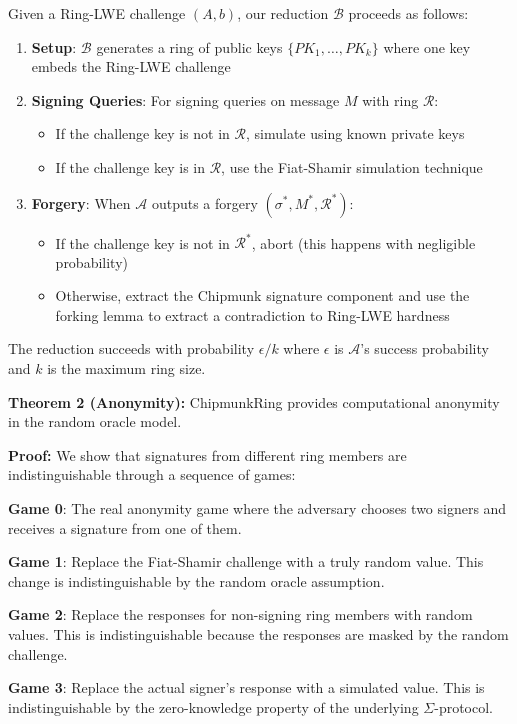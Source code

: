 \documentclass[11pt,a4paper]{article}
\begin{document}
Given a Ring-LWE challenge $(A, b)$, our reduction $\mathcal{B}$ proceeds as follows:
\begin{enumerate}
\item \textbf{Setup}: $\mathcal{B}$ generates a ring of public keys $\{PK_1, \ldots, PK_k\}$ where one key embeds the Ring-LWE challenge
\item \textbf{Signing Queries}: For signing queries on message $M$ with ring $\mathcal{R}$:
   \begin{itemize}
   \item If the challenge key is not in $\mathcal{R}$, simulate using known private keys
   \item If the challenge key is in $\mathcal{R}$, use the Fiat-Shamir simulation technique
   \end{itemize}
\item \textbf{Forgery}: When $\mathcal{A}$ outputs a forgery $(\sigma^*, M^*, \mathcal{R}^*)$:
   \begin{itemize}
   \item If the challenge key is not in $\mathcal{R}^*$, abort (this happens with negligible probability)
   \item Otherwise, extract the Chipmunk signature component and use the forking lemma to extract a contradiction to Ring-LWE hardness
   \end{itemize}
\end{enumerate}

The reduction succeeds with probability $\epsilon/k$ where $\epsilon$ is $\mathcal{A}$'s success probability and $k$ is the maximum ring size.

\textbf{Theorem 2 (Anonymity):} ChipmunkRing provides computational anonymity in the random oracle model.

\textbf{Proof:} We show that signatures from different ring members are indistinguishable through a sequence of games:

\textbf{Game 0}: The real anonymity game where the adversary chooses two signers and receives a signature from one of them.

\textbf{Game 1}: Replace the Fiat-Shamir challenge with a truly random value. This change is indistinguishable by the random oracle assumption.

\textbf{Game 2}: Replace the responses for non-signing ring members with random values. This is indistinguishable because the responses are masked by the random challenge.

\textbf{Game 3}: Replace the actual signer's response with a simulated value. This is indistinguishable by the zero-knowledge property of the underlying $\Sigma$-protocol.
\end{document}
